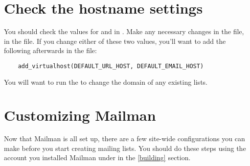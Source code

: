 \documentclass{howto}
\begin{document}
\section{Check the hostname settings}

You should check the values for  and
 in .  Make any necessary changes in
the  file,  in the  file.  If you
change either of these two values, you'll want to add the following afterwards
in the  file:

\begin{verbatim}
    add_virtualhost(DEFAULT_URL_HOST, DEFAULT_EMAIL_HOST)
\end{verbatim}

You will want to run the  to change the domain of any
existing lists.

\section{Customizing Mailman\label{customizing}}

Now that Mailman is all set up, there are a few site-wide configurations you
can make before you start creating mailing lists.  You should do these steps
using the account you installed Mailman under in the \ref{building} section.
\end{document}
